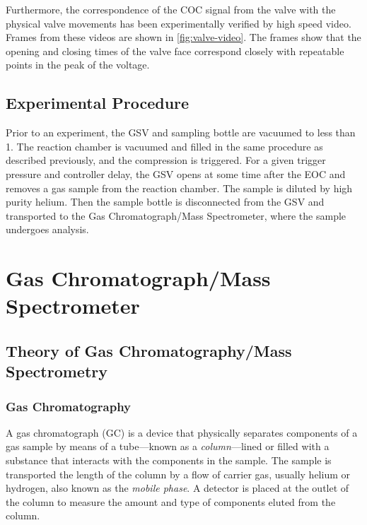 \documentclass[../main.tex]{subfiles}
\begin{document}
Furthermore, the correspondence of the COC signal from the valve with
the physical valve movements has been experimentally verified by
high speed video. Frames from these videos are shown in \cref{fig:valve-video}.
The frames show that the opening and closing times of the valve face
correspond closely with repeatable points in the peak of the voltage.


\subsection{Experimental Procedure}

Prior to an experiment, the GSV and sampling bottle are vacuumed to less
than \SI{1}{\torr}. The reaction chamber is vacuumed and filled in the same
procedure as described previously, and the compression is triggered. For a given
trigger pressure and controller delay, the GSV opens at some time after the EOC
and removes a gas sample from the reaction chamber. The sample is diluted by
high purity helium. Then the sample bottle is disconnected from the GSV and transported
to the Gas Chromatograph/Mass Spectrometer, where the sample undergoes analysis.

\section{Gas Chromatograph/Mass Spectrometer}
\label{sec:gcms}

\subsection{Theory of Gas Chromatography/Mass Spectrometry}
\label{sec:gcms-theory}

\subsubsection{Gas Chromatography}

A gas chromatograph (GC) is a device that physically separates components
of a gas sample by means of a tube---known as a \textit{column}---lined or filled
with a substance that interacts with the components in the sample. The sample
is transported the length of the column by a flow of carrier gas, usually
helium or hydrogen, also known as the \textit{mobile phase}. A detector is
placed at the outlet of the column to measure the amount and type
of components eluted from the column.
\end{document}
